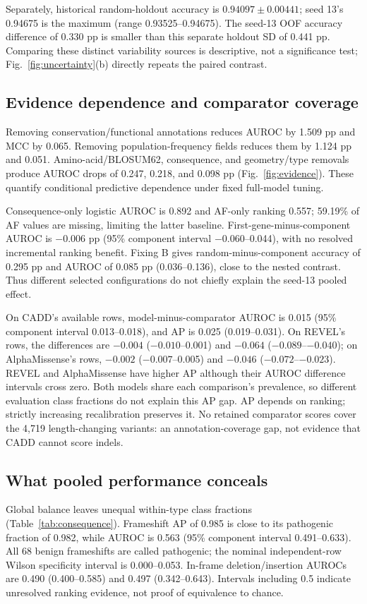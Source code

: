 Separately, historical random-holdout accuracy is $0.94097\pm0.00441$; seed 13's 0.94675 is the maximum (range 0.93525--0.94675). The seed-13 OOF accuracy difference of 0.330 pp is smaller than this separate holdout SD of 0.441 pp. Comparing these distinct variability sources is descriptive, not a significance test; Fig.~\ref{fig:uncertainty}(b) directly repeats the paired contrast.

\subsection{Evidence dependence and comparator coverage}
Removing conservation/functional annotations reduces AUROC by 1.509 pp and MCC by 0.065. Removing population-frequency fields reduces them by 1.124 pp and 0.051. Amino-acid/BLOSUM62, consequence, and geometry/type removals produce AUROC drops of 0.247, 0.218, and 0.098 pp (Fig.~\ref{fig:evidence}). These quantify conditional predictive dependence under fixed full-model tuning.

Consequence-only logistic AUROC is 0.892 and AF-only ranking 0.557; 59.19\% of AF values are missing, limiting the latter baseline. First-gene-minus-component AUROC is $-0.006$ pp (95\% component interval $-0.060$--0.044), with no resolved incremental ranking benefit. Fixing B gives random-minus-component accuracy of 0.295 pp and AUROC of 0.085 pp (0.036--0.136), close to the nested contrast. Thus different selected configurations do not chiefly explain the seed-13 pooled effect.



On CADD's available rows, model-minus-comparator AUROC is 0.015 (95\% component interval 0.013--0.018), and AP is 0.025 (0.019--0.031). On REVEL's rows, the differences are $-0.004$ ($-0.010$--0.001) and $-0.064$ ($-0.089$--$-0.040$); on AlphaMissense's rows, $-0.002$ ($-0.007$--0.005) and $-0.046$ ($-0.072$--$-0.023$). REVEL and AlphaMissense have higher AP although their AUROC difference intervals cross zero. Both models share each comparison's prevalence, so different evaluation class fractions do not explain this AP gap. AP depends on ranking; strictly increasing recalibration preserves it. No retained comparator scores cover the 4,719 length-changing variants: an annotation-coverage gap, not evidence that CADD cannot score indels.

\subsection{What pooled performance conceals}
Global balance leaves unequal within-type class fractions (Table~\ref{tab:consequence}). Frameshift AP of 0.985 is close to its pathogenic fraction of 0.982, while AUROC is 0.563 (95\% component interval 0.491--0.633). All 68 benign frameshifts are called pathogenic; the nominal independent-row Wilson specificity interval is 0.000--0.053. In-frame deletion/insertion AUROCs are 0.490 (0.400--0.585) and 0.497 (0.342--0.643). Intervals including 0.5 indicate unresolved ranking evidence, not proof of equivalence to chance.

